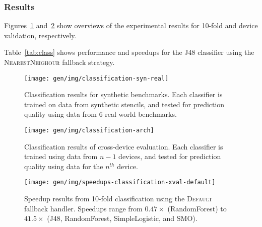 \subsubsection{Results}

Figures~\ref{fig:class-syn} and~\ref{fig:class-arch} show overviews of
the experimental results for 10-fold and device validation,
respectively.

Table~\ref{tab:class} shows performance and speedups for the J48
classifier using the \textsc{NearestNeighour} fallback strategy.

\begin{table}
\scriptsize
\centering
{}

\caption{%
  Performance relative to the oracle, speedup over baseline, and
  speedup over human expert of the J48 decision tree classifier using
  the \textsc{NearestNeighbour} fallback strategy. Note that speedups
  over human expert exclude scenarios for where the human expert
  prediction is invalid.%
}
\label{tab:class}
\end{table}



\cleardoublepage
\begin{figure}
\centering
\texttt{[image: gen/img/classification-syn-real]}
\caption{%
  Classification results for synthetic benchmarks. Each classifier is
  trained on data from synthetic stencils, and tested for prediction
  quality using data from 6 real world benchmarks.%
}
\label{fig:class-syn}
\end{figure}
\newpage
\begin{figure}
\centering
\texttt{[image: gen/img/classification-arch]}
\caption{%
  Classification results of cross-device evaluation. Each classifier
  is trained using data from $n-1$ devices, and tested for prediction
  quality using data for the $n^{th}$ device.%
}
\label{fig:class-arch}
\end{figure}

\begin{figure}
\centering
\texttt{[image: gen/img/speedups-classification-xval-default]}
\caption{%
  Speedup results from 10-fold classification using the
  \textsc{Default} fallback handler. Speedups range from $0.47\times$
  (RandomForest) to $41.5\times$ (J48, RandomForest, SimpleLogistic,
  and SMO).%
}
\end{figure}

